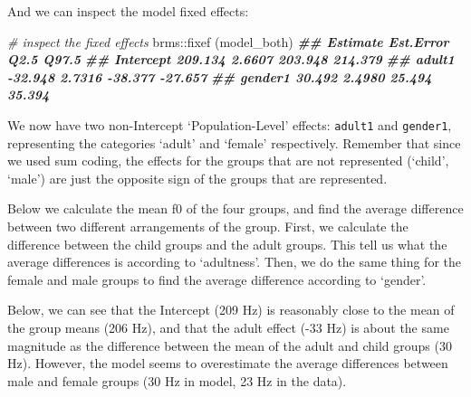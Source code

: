 \documentclass[
]{book}
\newenvironment{Shaded}{\begin{snugshade}}{\end{snugshade}}
\newcommand{\CommentTok}[1]{\textcolor[rgb]{0.56,0.35,0.01}{\textit{#1}}}
\newcommand{\DocumentationTok}[1]{\textcolor[rgb]{0.56,0.35,0.01}{\textbf{\textit{#1}}}}
\newcommand{\FunctionTok}[1]{\textcolor[rgb]{0.00,0.00,0.00}{#1}}
\newcommand{\NormalTok}[1]{#1}
\newcommand{\SpecialCharTok}[1]{\textcolor[rgb]{0.00,0.00,0.00}{#1}}
\begin{document}
And we can inspect the model fixed effects:

\begin{Shaded}
\begin{Highlighting}[]
\CommentTok{\# inspect the fixed effects}
\NormalTok{brms}\SpecialCharTok{::}\FunctionTok{fixef}\NormalTok{ (model\_both)}
\DocumentationTok{\#\#           Estimate Est.Error    Q2.5   Q97.5}
\DocumentationTok{\#\# Intercept  209.134    2.6607 203.948 214.379}
\DocumentationTok{\#\# adult1     {-}32.948    2.7316 {-}38.377 {-}27.657}
\DocumentationTok{\#\# gender1     30.492    2.4980  25.494  35.394}
\end{Highlighting}
\end{Shaded}

We now have two non-Intercept `Population-Level' effects: \texttt{adult1} and \texttt{gender1}, representing the categories `adult' and `female' respectively. Remember that since we used sum coding, the effects for the groups that are not represented (`child', `male') are just the opposite sign of the groups that are represented.

Below we calculate the mean f0 of the four groups, and find the average difference between two different arrangements of the group. First, we calculate the difference between the child groups and the adult groups. This tell us what the average differences is according to `adultness'. Then, we do the same thing for the female and male groups to find the average difference according to `gender'.

Below, we can see that the Intercept (209 Hz) is reasonably close to the mean of the group means (206 Hz), and that the adult effect (-33 Hz) is about the same magnitude as the difference between the mean of the adult and child groups (30 Hz). However, the model seems to overestimate the average differences between male and female groups (30 Hz in model, 23 Hz in the data).
\end{document}
